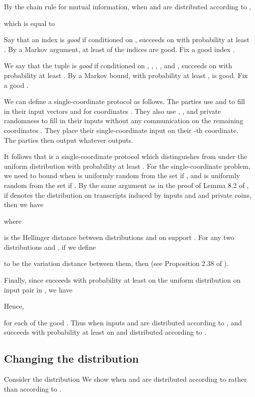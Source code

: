 \documentclass[twoside,leqno,twocolumn]{article}
\begin{document}
By the chain rule for mutual information, when  and  are
distributed according to , 

which is equal to 

Say that an index  is {\it good} if conditioned on ,
 succeeds on  with probability at least .
By a Markov argument, at least  of the indices  are good. 
Fix a good index . 

We say that the tuple  is {\it good} if conditioned on ,
, , , and ,  succeeds on 
with probability at least . By a Markov bound, with probability
at least ,  is good. Fix a good .

We can define a single-coordinate protocol  as follows. 
The parties use  and  to fill in their input
vectors  and  for coordinates . They also use 
, , and private randomness to fill in their inputs without any
communication on the remaining coordinates . They place their
single-coordinate input  on their -th coordinate. The parties
then output whatever  outputs. 

It follows that  is a 
single-coordinate protocol  which distinguishes
 from  under the uniform distribution 
with probability at least . 
For the single-coordinate problem, we need to bound
 when  is uniformly random from 
the set  if , and  is uniformly
random from the set  if . 
By the same argument as in the proof of Lemma 8.2 of 
\cite{BJKS04}, if  denotes the distribution on transcripts
induced by inputs  and  and private coins, then we have

where 

is the Hellinger distance between distributions  and  on support .
For any two distributions  and , if we define

to be the variation distance between them, then  (see Proposition 2.38 of \cite{BarYossefThesis}).
 
Finally, since  
succeeds with probability at least  on the uniform distribution
on input pair in , we have

Hence,

for each of the  good .  Thus  when inputs  and  are distributed according to
, and  succeeds with probability at least 
on  and  distributed according to .

\subsection{Changing the distribution}\label{sec:change} Consider the
distribution  We show  when  and 
are distributed according to  rather than according to
.
\end{document}

